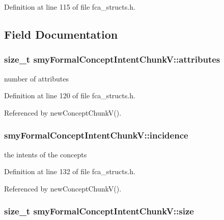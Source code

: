 \-Definition at line 115 of file fca\-\_\-structs.\-h.



\subsection{\-Field \-Documentation}
\hypertarget{structsmyFormalConceptIntentChunkV_ab40281b9f96435442255be08563782c0}{
\subsubsection[{attributes}]{\setlength{\rightskip}{0pt plus 5cm}size\-\_\-t {\bf smy\-Formal\-Concept\-Intent\-Chunk\-V\-::attributes}}}\label{structsmyFormalConceptIntentChunkV_ab40281b9f96435442255be08563782c0}


number of attributes 



\-Definition at line 120 of file fca\-\_\-structs.\-h.



\-Referenced by new\-Concept\-Chunk\-V().

\hypertarget{structsmyFormalConceptIntentChunkV_a12a126936dbafdf7ec85de7fed74eb8c}{
\subsubsection[{incidence}]{ {\bf smy\-Formal\-Concept\-Intent\-Chunk\-V\-::incidence}}}\label{structsmyFormalConceptIntentChunkV_a12a126936dbafdf7ec85de7fed74eb8c}


the intents of the concepts 



\-Definition at line 132 of file fca\-\_\-structs.\-h.



\-Referenced by new\-Concept\-Chunk\-V().

\hypertarget{structsmyFormalConceptIntentChunkV_acbb0ea8f58b4a13ecefc5a996c386206}{
\subsubsection[{size}]{\setlength{\rightskip}{0pt plus 5cm}size\-\_\-t {\bf smy\-Formal\-Concept\-Intent\-Chunk\-V\-::size}}}\label{structsmyFormalConceptIntentChunkV_acbb0ea8f58b4a13ecefc5a996c386206}


